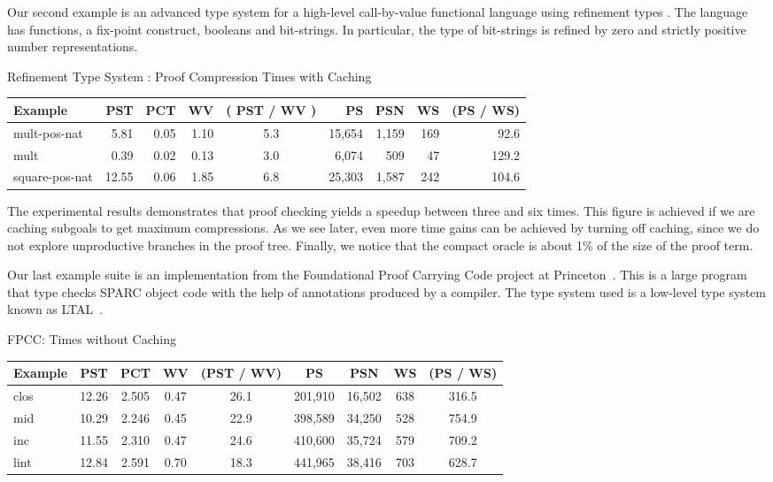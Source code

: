 \documentclass{llncs}
\begin{document}
Our second example is an advanced type system for a high-level
call-by-value functional language using refinement types
\cite{davies+:intersection}. The language has functions, a fix-point
construct, booleans and bit-strings. In particular, the type of  
bit-strings is refined by zero and strictly positive number
representations.

\begin{center}
\begin{small}
Refinement Type System : Proof Compression Times with Caching
\begin{tabular}{|l|r|r|r|c|r|r|r|r|}
\hline
Example & PST 
& PCT & WV & ( PST / WV ) & PS & PSN & WS & (PS / WS)\\
\hline
mult-pos-nat & 5.81 & 0.05 & 1.10 & 5.3
& 15,654 & 1,159 & 169 & 92.6\\
mult & 0.39 & 0.02 & 0.13 & 3.0
& 6,074 & 509 & 47 & 129.2\\
square-pos-nat & 12.55 & 0.06 & 1.85 & 6.8 
& 25,303 & 1,587 & 242 & 104.6\\
\hline
\end{tabular}
\end{small}
\end{center}

The experimental results demonstrates that proof checking yields a
speedup between three and six times. This figure is achieved if we are
caching subgoals to get maximum compressions. As we see later, even
more time gains can be achieved by turning off caching, since we do
not explore unproductive branches in the proof tree.
Finally, 
we notice that the compact oracle is about 1\% of the size of the
proof term.

Our last example suite is an implementation from the Foundational 
Proof Carrying Code project at Princeton~\cite{Appel01lics}. This 
is a large program that type checks SPARC object code with the help 
of annotations produced by a compiler. The type system used is a
low-level type system known as LTAL~\cite{chen+:fpcc-ltal}.

\begin{center}
FPCC: Times without Caching
\begin{small}
\begin{tabular}{|l|c|c|c|c|c|c|c|c|}
\hline
Example & PST & PCT & WV & (PST / WV) & PS & PSN & WS & (PS / WS)\\
\hline
clos & 12.26 & 2.505 & 0.47 & 26.1& 201,910 & 16,502 & 638 & 316.5\\
mid & 10.29 & 2.246 & 0.45 & 22.9& 398,589 & 34,250 & 528 & 754.9\\
inc & 11.55 & 2.310 & 0.47 & 24.6& 410,600 & 35,724 & 579 & 709.2\\
lint & 12.84 & 2.591 & 0.70 & 18.3& 441,965 & 38,416 & 703 & 628.7\\
\hline
\end{tabular}
\end{small}
\end{center}
\end{document}
